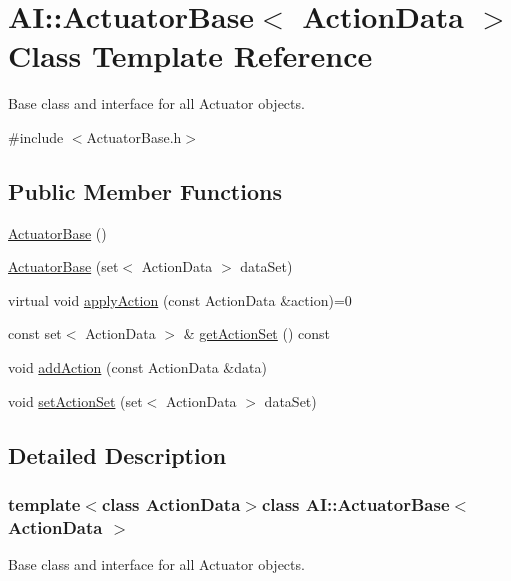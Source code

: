 \hypertarget{classAI_1_1ActuatorBase}{\section{A\-I\-:\-:Actuator\-Base$<$ Action\-Data $>$ Class Template Reference}
\label{classAI_1_1ActuatorBase}
}


Base class and interface for all Actuator objects.  




{\ttfamily \#include $<$Actuator\-Base.\-h$>$}

\subsection*{Public Member Functions}
\begin{DoxyCompactItemize}
\item 
\hyperlink{classAI_1_1ActuatorBase_aa58ed23d9f5821a20f7a0d3ce38a78fb}{Actuator\-Base} ()
\item 
\hyperlink{classAI_1_1ActuatorBase_a2f59e4f7afbaa20a5fcc9482661c7df2}{Actuator\-Base} (set$<$ Action\-Data $>$ data\-Set)
\item 
virtual void \hyperlink{classAI_1_1ActuatorBase_aecd4ee9cf0e33633c1c48028b4cb89a1}{apply\-Action} (const Action\-Data \&action)=0
\item 
const set$<$ Action\-Data $>$ \& \hyperlink{classAI_1_1ActuatorBase_a9cdda5a803a74a6f4c2c93b9dd3e62fc}{get\-Action\-Set} () const 
\item 
void \hyperlink{classAI_1_1ActuatorBase_acb2aab24c4489d4e084935eb6051ee50}{add\-Action} (const Action\-Data \&data)
\item 
void \hyperlink{classAI_1_1ActuatorBase_ac27dd4d19cc38145fbc9ab1e706264fc}{set\-Action\-Set} (set$<$ Action\-Data $>$ data\-Set)
\end{DoxyCompactItemize}


\subsection{Detailed Description}
\subsubsection*{template$<$class Action\-Data$>$class A\-I\-::\-Actuator\-Base$<$ Action\-Data $>$}

Base class and interface for all Actuator objects. 


